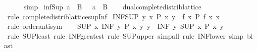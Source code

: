 \begin{isabellebody}
\ \ \ \ \isamarkupfalse%
\ simp\isanewline
{}\isamarkupfalse%
%
\endisatagproof
{\isafoldproof}%
%
\isadelimproof
\isanewline
%
\endisadelimproof
\isanewline
{}\isamarkupfalse%
\ inf{\isacharunderscore}{\kern0pt}Sup{\isacharcolon}{\kern0pt}\ {\isachardoublequoteopen}a\ {\isasymsqinter}\ {\isasymSqunion}B\ {\isacharequal}{\kern0pt}\ {\isasymSqunion}{\isacharparenleft}{\kern0pt}{\isacharparenleft}{\kern0pt}{\isasymsqinter}{\isacharparenright}{\kern0pt}\ a\ {\isacharbackquote}{\kern0pt}\ B{\isacharparenright}{\kern0pt}{\isachardoublequoteclose}\isanewline
%
\isadelimproof
\ \ %
\endisadelimproof
%
\isatagproof
{}\isamarkupfalse%
\ dual{\isacharunderscore}{\kern0pt}complete{\isacharunderscore}{\kern0pt}distrib{\isacharunderscore}{\kern0pt}lattice\isanewline
\ \ \isamarkupfalse%
\ {\isacharparenleft}{\kern0pt}rule\ complete{\isacharunderscore}{\kern0pt}distrib{\isacharunderscore}{\kern0pt}lattice{\isachardot}{\kern0pt}sup{\isacharunderscore}{\kern0pt}Inf{\isacharparenright}{\kern0pt}%
\endisatagproof
{\isafoldproof}%
%
\isadelimproof
\isanewline
%
\endisadelimproof
\isanewline
{}\isamarkupfalse%
\ INF{\isacharunderscore}{\kern0pt}SUP{\isacharcolon}{\kern0pt}\ {\isachardoublequoteopen}{\isacharparenleft}{\kern0pt}{\isasymSqinter}y{\isachardot}{\kern0pt}\ {\isasymSqunion}x{\isachardot}{\kern0pt}\ P\ x\ y{\isacharparenright}{\kern0pt}\ {\isacharequal}{\kern0pt}\ {\isacharparenleft}{\kern0pt}{\isasymSqunion}f{\isachardot}{\kern0pt}\ {\isasymSqinter}x{\isachardot}{\kern0pt}\ P\ {\isacharparenleft}{\kern0pt}f\ x{\isacharparenright}{\kern0pt}\ x{\isacharparenright}{\kern0pt}{\isachardoublequoteclose}\isanewline
%
\isadelimproof
%
\endisadelimproof
%
\isatagproof
{}\isamarkupfalse%
\ {\isacharparenleft}{\kern0pt}rule\ order{\isachardot}{\kern0pt}antisym{\isacharparenright}{\kern0pt}\isanewline
\ \ \isamarkupfalse%
\ {\isachardoublequoteopen}{\isacharparenleft}{\kern0pt}SUP\ x{\isachardot}{\kern0pt}\ INF\ y{\isachardot}{\kern0pt}\ P\ {\isacharparenleft}{\kern0pt}x\ y{\isacharparenright}{\kern0pt}\ y{\isacharparenright}{\kern0pt}\ {\isasymle}\ {\isacharparenleft}{\kern0pt}INF\ y{\isachardot}{\kern0pt}\ SUP\ x{\isachardot}{\kern0pt}\ P\ x\ y{\isacharparenright}{\kern0pt}{\isachardoublequoteclose}\isanewline
\ \ \ \ \isamarkupfalse%
\ {\isacharparenleft}{\kern0pt}rule\ SUP{\isacharunderscore}{\kern0pt}least{\isacharcomma}{\kern0pt}\ rule\ INF{\isacharunderscore}{\kern0pt}greatest{\isacharcomma}{\kern0pt}\ rule\ SUP{\isacharunderscore}{\kern0pt}upper{}{\isacharcomma}{\kern0pt}\ simp{\isacharunderscore}{\kern0pt}all{\isacharcomma}{\kern0pt}\ rule\ INF{\isacharunderscore}{\kern0pt}lower{}{\isacharcomma}{\kern0pt}\ simp{\isacharcomma}{\kern0pt}\ blast{\isacharparenright}{\kern0pt}\isanewline

\end{isabellebody}
